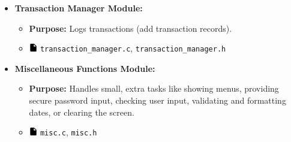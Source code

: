 \documentclass[12pt,a4paper]{report}
\begin{document}
\begin{itemize}
\begin{itemize}
    \end{itemize}
    \item \normalsize \textbf{Transaction Manager Module:}
    \begin{itemize}
        \item \normalsize \textbf{Purpose:} Logs transactions (add transaction records).
        \item \includegraphics[width=0.03\textwidth]{../resources/assets/images/file_icon.png} \texttt{transaction\_manager.c}, \texttt{transaction\_manager.h}
    \end{itemize}
    \item \normalsize \textbf{Miscellaneous Functions Module:}
    \begin{itemize}
        \item \normalsize \textbf{Purpose:} Handles small, extra tasks like showing menus, providing secure password input, checking user input, validating and formatting dates, or clearing the screen.
        \item \includegraphics[width=0.03\textwidth]{../resources/assets/images/file_icon.png} \texttt{misc.c}, \texttt{misc.h}
    \end{itemize}
\end{itemize}
\end{document}
